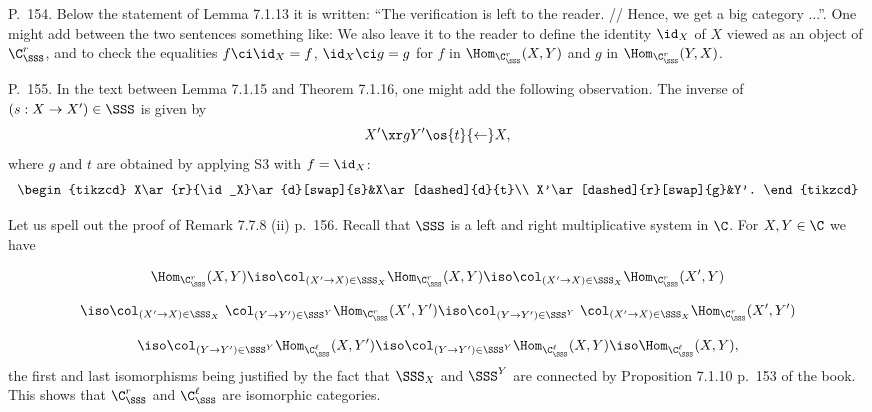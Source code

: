 \documentclass[12pt]{article}
\theoremstyle{remark}
\theoremstyle{definition}
\begin{document}
%


%

\begin{s} 
P.~154. Below the statement of Lemma 7.1.13 it is written: ``The verification is left to the reader. // Hence, we get a big category ...''. One might add between the two sentences something like: We also leave it to the reader to define the identity $\id_X$ of $X$ viewed as an object of $\C^r_\SSS$, and to check the equalities $f\ci\id_X=f$, $\id_X\ci g=g$ for $f$ in $\Hom_{\C^r_\SSS}(X,Y)$ and $g$ in $\Hom_{\C^r_\SSS}(Y,X)$.
\end{s}

%

\begin{s} 
P.~155. In the text between Lemma 7.1.15 and Theorem 7.1.16, one might add the following observation. The inverse of $(s:X\to X')\in\SSS$ is given by 
$$
X'\xr gY'\os{t}{\leftarrow}X,
$$
where $g$ and $t$ are obtained by applying S3 with $f=\id_X$:
$$
\begin{tikzcd}
X\ar{r}{\id_X}\ar{d}[swap]{s}&X\ar[dashed]{d}{t}\\ X'\ar[dashed]{r}[swap]{g}&Y'.
\end{tikzcd}
$$
\end{s}

%

\begin{s}
Let us spell out the proof of Remark 7.7.8 (ii) p.~156. Recall that $\SSS$ is a left and right multiplicative system in $\C$. For $X,Y\in\C$ we have 

$$
\Hom_{\C_\SSS^r}(X,Y)\iso\col_{(X'\to X)\in\SSS_X}\Hom_{\C_\SSS^r}(X,Y)\iso\col_{(X'\to X)\in\SSS_X}\Hom_{\C_\SSS^r}(X',Y)
$$

$$
\iso
\col_{(X'\to X)\in\SSS_X}\ \col_{(Y\to Y')\in\SSS^Y}\Hom_{\C_\SSS^r}(X',Y')\iso
\col_{(Y\to Y')\in\SSS^Y}\ \col_{(X'\to X)\in\SSS_X}\Hom_{\C_\SSS^r}(X',Y')
$$

$$
\iso
\col_{(Y\to Y')\in\SSS^Y}\Hom_{\C_\SSS^\ell}(X,Y')\iso
\col_{(Y\to Y')\in\SSS^Y}\Hom_{\C_\SSS^\ell}(X,Y)\iso
\Hom_{\C_\SSS^\ell}(X,Y),
$$ 
the first and last isomorphisms being justified by the fact that $\SSS_X$ and $\SSS^Y$ are connected by Proposition 7.1.10 p.~153 of the book. This shows that $\C_\SSS^r$ and $\C_\SSS^\ell$ are isomorphic categories.
\end{s}
\end{document}

